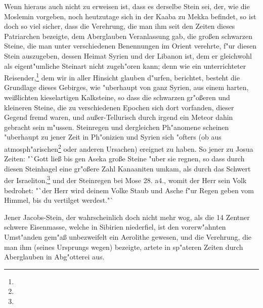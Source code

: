 \documentclass[a4paper, 11pt, oneside, polutonikogreek, german]{article}
\begin{document}
Wenn hieraus auch nicht zu erweisen ist, dass es derselbe Stein sei, der, wie die Moslemin vorgeben, noch heutzutage sich in der Kaaba zu Mekka befindet, so ist doch so viel sicher, dass die Verehrung, die man ihm seit den Zeiten dieses Patriarchen bezeigte, dem Aberglauben Veranlassung gab, die großen schwarzen Steine, die man unter verschiedenen Benennungen im Orient verehrte, f"ur diesen Stein auszugeben, dessen Heimat Syrien und der Libanon ist, dem er gleichwohl als eigent"umliche Steinart nicht zugeh"oren kann; denn wie ein unterrichteter Reisender,\footnote{} dem wir in aller Hinsicht glauben d"urfen, berichtet, besteht die Grundlage dieses Gebirges, wie "uberhaupt von ganz Syrien, aus einem harten, weißlichten kieselartigen Kalksteine, so dass die schwarzen gr"oßeren und kleineren Steine, die zu verschiedenen Epochen sich dort vorfanden, dieser Gegend fremd waren, und außer-Tellurisch durch irgend ein Meteor dahin gebracht sein m"ussen. Steinregen und dergleichen Ph"anomene scheinen "uberhaupt zu jener Zeit in Ph"onizien und Syrien sich "ofters (ob aus atmosph"arischen\footnote{} oder anderen Ursachen) ereignet zu haben. So jener zu Josua Zeiten: "`Gott ließ bis gen Aseka große Steine "uber sie regnen, so dass durch diesen Steinhagel eine gr"oßere Zahl Kanaaniten umkam, als durch das Schwert der Israeliton,\footnote{} und der Steinregen bei Mose 28. a4., womit der Herr sein Volk bedrohet: "`der Herr wird deinem Volke Staub und Asche f"ur Regen geben vom Himmel, bis du vertilget werdest."`

Jener Jacobs-Stein, der wahrscheinlich doch nicht mehr wog, als die 14 Zentner schwere Eisenmasse, welche in Sibirien niederfiel, ist den vorerw"ahnten Umst"anden gem"aß unbezweifelt ein Aerolithe gewesen, und die Verehrung, die man ihm (seines Ursprungs wegen) bezeigte, artete in sp"ateren Zeiten durch Aberglauben in Abg"otterei aus.
\end{document}
